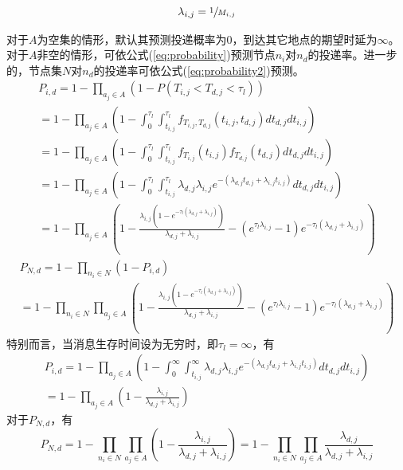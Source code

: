 \[
\lambda_{i,j} = \sfrac{1}{M_{i,j}}
\]

对于$A$为空集的情形，默认其预测投递概率为0，到达其它地点的期望时延为$\infty$。对于$A$非空的情形，可依公式(\ref{eq:probability})预测节点$n_i$对$n_d$的投递率。进一步的，节点集$N$对$n_d$的投递率可依公式(\ref{eq:probability2})预测。
\begin{multline}
P_{i,d}=1-\prod_{a_j\in A}\left(1-P(T_{i,j}<T_{d,j}<\tau_l) \right) \\
=1-\prod_{a_j\in A}\left(1-\int _{0}^{\tau _l}\!\!\!\!\int _{t_{i,j}}^{\tau _l}f_{T_{i,j},T_{d,j}}\left(t_{i,j},t_{d,j}\right)dt_{d,j}dt_{i,j}\right)\\
=1-\prod_{a_j\in A}\left(1-\int _{0}^{\tau _l}\!\!\!\!\int _{t_{i,j}}^{\tau _l}f_{T_{i,j}}(t_{i,j})f_{T_{d,j}}(t_{d,j}) dt_{d,j}dt_{i,j}\right) \\
=1-\prod_{a_j\in A}\left(1-\int _{0}^{\tau _l}\!\!\!\!\int _{t_{i,j}}^{\tau _l}\lambda _{d,j} \lambda _{i,j} e^{-\left(\lambda _{d,j}t_{d,j}+\lambda _{i,j}t_{i,j}\right)}dt_{d,j}dt_{i,j}\right)\\
=1-\prod_{a_j\in A}\left(1-\frac{\lambda _{i,j} \left(1-e^{-\tau _l \left(\lambda _{d,j}+\lambda _{i,j}\right)}\right)}{\lambda _{d,j}+\lambda _{i,j}}
-\left(e^{\tau _l \lambda _{i,j}}-1\right) e^{-\tau _l \left(\lambda _{d,j}+\lambda _{i,j}\right)}\right)
\label{eq:probability}
\end{multline}
\begin{multline}
P_{N,d}=1-\prod_{n_i\in N}(1-P_{i,d}) \\
=1-\prod_{n_i\in N}\prod_{a_j\in A}\left(1-\frac{\lambda _{i,j} \left(1-e^{-\tau _l \left(\lambda _{d,j}+\lambda _{i,j}\right)}\right)}{\lambda _{d,j}+\lambda _{i,j}}
-\left(e^{\tau _l \lambda _{i,j}}-1\right) e^{-\tau _l \left(\lambda _{d,j}+\lambda _{i,j}\right)}\right)
\label{eq:probability2}
\end{multline}
特别而言，当消息生存时间设为无穷时，即$\tau_l=\infty$，有
\begin{multline}
P_{i,d} = 1-
\prod_{a_j\in A}\left(1-\int _0^{\infty }\!\!\!\!\int _{t_{i,j}}^{\infty }\lambda _{d,j} \lambda _{i,j} e^{-\left(\lambda _{d,j} t_{d,j}+\lambda _{i,j} t_{i,j}\right)}dt_{d,j}dt_{i,j} \right)\\
=1-\prod_{a_j\in A}\left(1-\frac{\lambda _{i,j}}{\lambda _{d,j}+\lambda _{i,j}}\right)
\label{eq:probability_infty}
\end{multline}
对于$P_{N,d}$，有
\begin{equation}
P_{N,d} = 1-\prod_{n_i\in N}\prod_{a_j\in A}\left(1-\frac{\lambda _{i,j}}{\lambda _{d,j}+\lambda _{i,j}}\right) 
=1-\prod_{n_i\in N}\prod_{a_j\in A}\frac{\lambda _{d,j}}{\lambda _{d,j}+\lambda _{i,j}}
\label{eq:probability2_infty}
\end{equation}

